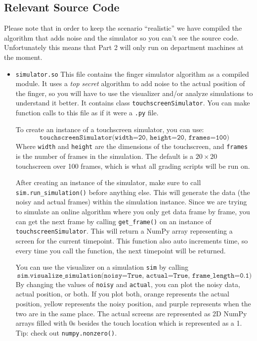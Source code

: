 \documentclass{article}
\begin{document}
\subsection{Relevant Source Code}
Please note that in order to keep the scenario ``realistic'' we have compiled the algorithm that adds noise and the simulator so you can't see the source code. Unfortunately this means that Part 2 will only run on department machines at the moment.
\begin{itemize}
    \item \texttt{simulator.so}
    This file contains the finger simulator algorithm as a compiled module. It uses a \textit{top secret} algorithm to add noise to the actual position of the finger, so you will have to use the visualizer and/or analyze simulations to understand it better. It contains class \texttt{touchscreenSimulator}. You can make function calls to this file as if it were a \texttt{.py} file.

    To create an instance of a touchscreen simulator, you can use:
    \[\texttt{touchscreenSimulator(width=20, height=20, frames=100)}\]
    Where \texttt{width} and \texttt{height} are the dimensions of the touchscreen, and \texttt{frames} is the number of frames in the simulation. The default is a $20 \times 20$ touchscreen over 100 frames, which is what all grading scripts will be run on.

    After creating an instance of the simulator, make sure to call \texttt{sim.run\_simulation()} before anything else. This will generate the data (the noisy and actual frames) within the simulation instance. Since we are trying to simulate an online algorithm where you only get data frame by frame, you can get the next frame by calling \texttt{get\_frame()} on an instance of \texttt{touchscreenSimulator}. This will return a NumPy array representing a screen for the current timepoint. This function also auto increments time, so every time you call the function, the next timepoint will be returned.

    You can use the visualizer on a simulation \texttt{sim} by calling
    \[\texttt{sim.visualize\_simulation(noisy=True, actual=True, frame\_length=0.1)}\]
    By changing the values of \texttt{noisy} and \texttt{actual}, you can plot the noisy data, actual position, or both. If you plot both, orange represents the actual position, yellow represents the noisy position, and purple represents when the two are in the same place. The actual screens are represented as 2D NumPy arrays filled with 0s besides the touch location which is represented as a 1. Tip: check out \texttt{numpy.nonzero()}.


\end{itemize}
\end{document}

